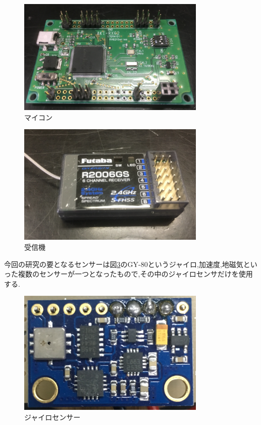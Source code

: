 \documentclass[12pt,oneside]{paper}
\begin{document}
\begin{figure}[H]
\begin{center}
\includegraphics[width=90mm]{ga/RX621.jpg}
\end{center}
\caption{マイコン}
\label{fig:RX621}
\end{figure}

\begin{figure}[H]
\begin{center}
\includegraphics[width=90mm]{ga/res.jpg}
\end{center}
\caption{受信機}
\label{fig:R2006GS}
\end{figure}

今回の研究の要となるセンサーは図\ref{fig:GY-80}のGY-80というジャイロ,加速度,地磁気といった複数のセンサーが一つとなったもので,その中のジャイロセンサだけを使用する.

\begin{figure}[H]
\begin{center}
\includegraphics[width=90mm]{ga/GY-80.jpg}
\end{center}
\caption{ジャイロセンサー}
\label{fig:GY-80}
\end{figure}
\end{document}
